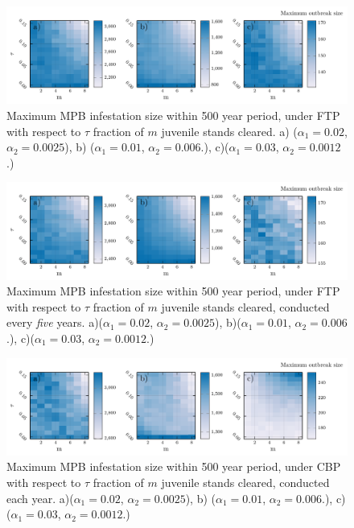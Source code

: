 

\begin{figure}
    \includegraphics[width=\textwidth]{appendices/data_base_fig.pdf}
    \caption{Maximum MPB infestation size within 500 year period, under FTP with respect to $\tau$ fraction of $m$ juvenile stands cleared. a) ($\alpha_1 = 0.02$, $\alpha_2 = 0.0025$), b) ($\alpha_1 = 0.01$, $\alpha_2 = 0.006$.), c)($\alpha_1 = 0.03$, $\alpha_2 = 0.0012$.)}
    \label{beetle_pop_yearly}
  \end{figure}
  
  \begin{figure}
    \includegraphics[width=\textwidth]{appendices/data_five_year_trim_fig.pdf}
    \caption{Maximum MPB infestation size within 500 year period, under FTP with respect to $\tau$ fraction of $m$ juvenile stands cleared, conducted every \emph{five} years. a)($\alpha_1 = 0.02$, $\alpha_2 = 0.0025$), b)($\alpha_1 = 0.01$, $\alpha_2 = 0.006$.), c)($\alpha_1 = 0.03$, $\alpha_2 = 0.0012$.)}
  \end{figure}
  
  \begin{figure}
    \includegraphics[width=\textwidth]{appendices/data_yearly_burn_fig.pdf}
    \caption{Maximum MPB infestation size within 500 year period, under CBP with respect to $\tau$ fraction of $m$ juvenile stands cleared, conducted each year. a)($\alpha_1 = 0.02$, $\alpha_2 = 0.0025$), b) ($\alpha_1 = 0.01$, $\alpha_2 = 0.006$.), c) ($\alpha_1 = 0.03$, $\alpha_2 = 0.0012$.)}
  \end{figure}

